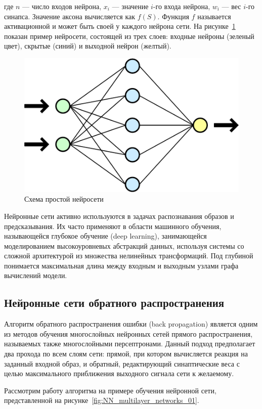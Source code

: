 \documentclass[a4paper,14pt]{extarticle} %
\begin{document}
\noindent где $n$ --- число входов нейрона, $x_i$ --- значение $i$-го входа нейрона, $w_i$ --- вес $i$-го синапса. Значение аксона вычисляется как $f(S)$. Функция $f$ называется активационной и может быть своей у каждого нейрона сети. На рисунке~\ref{fig:Neuralnetwork} показан пример нейросети, состоящей из трех слоев: входные нейроны (зеленый цвет), скрытые (синий) и выходной нейрон (желтый).
\begin{figure}[H]
\centering
\includegraphics[width=0.7\linewidth]{Neuralnetwork}
\caption{Схема простой нейросети}
\label{fig:Neuralnetwork}
\end{figure}

Нейронные сети активно используются в задачах распознавания образов и предсказывания. Их часто применяют в области машинного обучения, называющейся глубокое обучение (deep learning), занимающейся моделированием высокоуровневых абстракций данных, используя системы со сложной архитектурой из множества нелинейных трансформаций. Под глубиной понимается максимальная длина между входным и выходным узлами графа вычислений модели.

\subsection{Нейронные сети обратного распространения}
\hspace{\parindent} Алгоритм обратного распространения ошибки (back propagation) является одним из методов обучения многослойных нейронных сетей прямого распространения, называемых также многослойными персептронами. Данный подход предполагает два прохода по всем слоям сети: прямой, при котором вычисляется реакция на заданный входной образ, и обратный, редактирующий синаптические веса с целью максимального приближения выходного сигнала сети к желаемому. 

Рассмотрим работу алгоритма на примере обучения нейронной сети, представленной на рисунке~\ref{fig:NN_multilayer_networks_01}.
\end{document}
